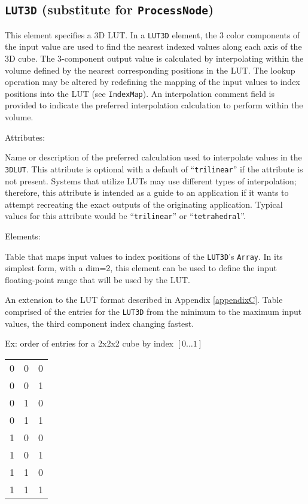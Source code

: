 \subsection{\texttt{LUT3D} (substitute for \texttt{ProcessNode})}
This element specifies a 3D LUT. In a \texttt{LUT3D} element, the 3 color components of the input value are used to find the nearest indexed values along each axis of the 3D cube. The 3-component output value is calculated by interpolating within the volume defined by the nearest corresponding positions in the LUT. The lookup operation may be altered by redefining the mapping of the input values to index positions into the LUT (see \texttt{IndexMap}). An interpolation comment field is provided to indicate the preferred interpolation calculation to perform within the volume.

Attributes:
\begin{xmlfields}
	\xmlitem[interpolation][optional] Name or description of the preferred calculation used to interpolate values in the \texttt{3DLUT}. This attribute is optional with a default of ``\texttt{trilinear}'' if the attribute is not present. Systems that utilize LUTs may use different types of interpolation; therefore, this attribute is  intended as a guide to an application if it wants to attempt recreating the exact outputs of the originating application. Typical values for this attribute would be ``\texttt{trilinear}'' or ``\texttt{tetrahedral}''.
\end{xmlfields}

Elements:
\begin{xmlfields}
	\xmlitem[IndexMap][optional] Table that maps input values to index positions of the \texttt{LUT3D}'s \texttt{Array}. 
		In its simplest form, with a dim=2, this element can be used to define the input floating-point range that will be used by the LUT.\par
		An extension to the LUT format described in Appendix \ref{appendixC}.
	\xmlitem[Array][required] Table comprised of the entries for the \texttt{LUT3D} from the minimum to the maximum input values, the third component index changing fastest.

		Ex:   order of entries for a 2x2x2 cube by index $[0 \ldots 1]$
		
		\begin{center}
			\begin{tabularx}{1in}{XXX}
				0 & 0 & 0 \\
				0 & 0 & 1 \\
				0 & 1 & 0 \\
				0 & 1 & 1 \\
				1 & 0 & 0 \\
				1 & 0 & 1 \\
				1 & 1 & 0 \\
				1 & 1 & 1 \\
			\end{tabularx}
		\end{center}
\end{xmlfields}

